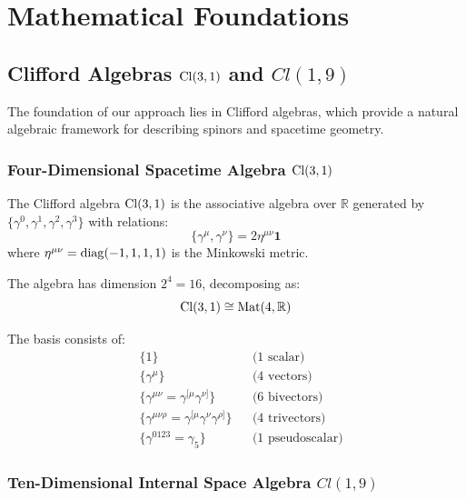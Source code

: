\section{Mathematical Foundations}
\label{sec:math}

\subsection{Clifford Algebras $\mathrm{Cl}(3,1)$ and $Cl(1,9)$}

The foundation of our approach lies in Clifford algebras, which provide a natural algebraic framework for describing spinors and spacetime geometry.

\subsubsection{Four-Dimensional Spacetime Algebra $\mathrm{Cl}(3,1)$}

\begin{definition}
The Clifford algebra $\mathrm{Cl}(3,1)$ is the associative algebra over $\mathbb{R}$ generated by $\{\gamma^0, \gamma^1, \gamma^2, \gamma^3\}$ with relations:
\begin{equation}
    \{\gamma^\mu, \gamma^\nu\} = 2\eta^{\mu\nu} \mathbf{1}
\end{equation}
where $\eta^{\mu\nu} = \mathrm{diag}(-1, 1, 1, 1)$ is the Minkowski metric.
\end{definition}

The algebra has dimension $2^4 = 16$, decomposing as:
\begin{equation}
    \mathrm{Cl}(3,1) \cong \text{Mat}(4, \mathbb{R})
\end{equation}

The basis consists of:
\begin{align}
    &\{1\} && \text{(1 scalar)} \\
    &\{\gamma^\mu\} && \text{(4 vectors)} \\
    &\{\gamma^{\mu\nu} = \gamma^{[\mu}\gamma^{\nu]}\} && \text{(6 bivectors)} \\
    &\{\gamma^{\mu\nu\rho} = \gamma^{[\mu}\gamma^\nu\gamma^{\rho]}\} && \text{(4 trivectors)} \\
    &\{\gamma^{0123} = \gamma_5\} && \text{(1 pseudoscalar)}
\end{align}

\subsubsection{Ten-Dimensional Internal Space Algebra $Cl(1,9)$}

